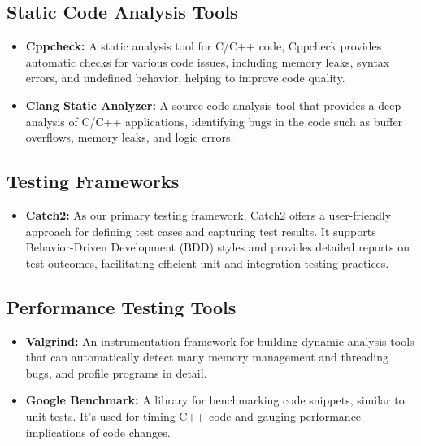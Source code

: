 \documentclass[12pt]{article}
\begin{document}
\subsection{Static Code Analysis Tools}
\begin{itemize}
    \item \textbf{Cppcheck:} A static analysis tool for C/C++ code, Cppcheck provides automatic checks for various code issues, including memory leaks, syntax errors, and undefined behavior, helping to improve code quality.
    \item \textbf{Clang Static Analyzer:} A source code analysis tool that provides a deep analysis of C/C++ applications, identifying bugs in the code such as buffer overflows, memory leaks, and logic errors.
\end{itemize}

\subsection{Testing Frameworks}
\begin{itemize}
    \item \textbf{Catch2:} As our primary testing framework, Catch2 offers a user-friendly approach for defining test cases and capturing test results. It supports Behavior-Driven Development (BDD) styles and provides detailed reports on test outcomes, facilitating efficient unit and integration testing practices.
\end{itemize}

\subsection{Performance Testing Tools}
\begin{itemize}
    \item \textbf{Valgrind:} An instrumentation framework for building dynamic analysis tools that can automatically detect many memory management and threading bugs, and profile programs in detail.
    \item \textbf{Google Benchmark:} A library for benchmarking code snippets, similar to unit tests. It's used for timing C++ code and gauging performance implications of code changes.
\end{itemize}
\end{document}
